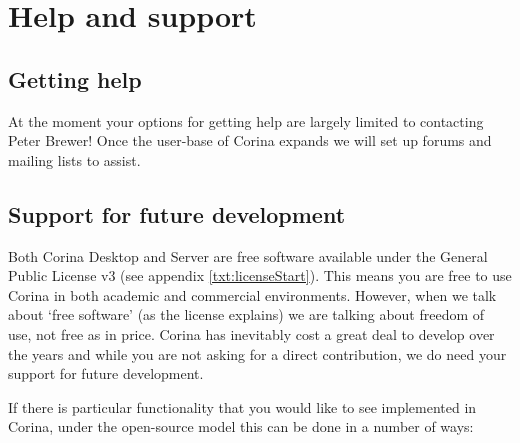 \chapter{Help and support}


\section{Getting help}

At the moment your options for getting help are largely limited to contacting Peter Brewer!  Once the user-base of Corina expands we will set up forums and mailing lists to assist.


\section{Support for future development}
Both Corina Desktop and Server are free software available under the General Public License v3 (see appendix \ref{txt:licenseStart}).  This means you are free to use Corina in both academic and commercial environments.  However, when we talk about `free software' (as the license explains) we are talking about freedom of use, not free as in price.  Corina has inevitably cost a great deal to develop over the years and while you are not asking for a direct contribution, we do need your support for future development.

If there is particular functionality that you would like to see implemented in Corina, under the open-source model this can be done in a number of ways:


